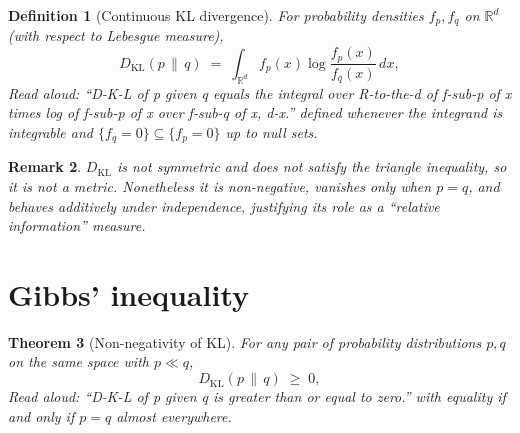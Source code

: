 \documentclass[11pt]{article}
\newtheorem{theorem}{Theorem}
\newtheorem{definition}[theorem]{Definition}
\newtheorem{remark}[theorem]{Remark}
\begin{document}
\begin{definition}[Continuous KL divergence]
For probability densities $f_p, f_q$ on $\mathbb{R}^d$ (with respect to Lebesgue measure),
\[
D_{\mathrm{KL}}(p \,\|\, q) \;=\; \int_{\mathbb{R}^d} f_p(x) \log \frac{f_p(x)}{f_q(x)} \, dx,
\]
\emph{Read aloud:} ``D-K-L of p given q equals the integral over R-to-the-d of f-sub-p of x times log of f-sub-p of x over f-sub-q of x, d-x.''
defined whenever the integrand is integrable and $\{f_q = 0\} \subseteq \{f_p = 0\}$ up to null sets.
\end{definition}

\begin{remark}
$D_{\mathrm{KL}}$ is \emph{not} symmetric and does \emph{not} satisfy the triangle inequality, so it is not a metric. Nonetheless it is non-negative, vanishes only when $p = q$, and behaves additively under independence, justifying its role as a ``relative information'' measure.
\end{remark}

\section{Gibbs' inequality}

\begin{theorem}[Non-negativity of KL]
\label{thm:gibbs}
For any pair of probability distributions $p, q$ on the same space with $p \ll q$,
\[
D_{\mathrm{KL}}(p \,\|\, q) \;\ge\; 0,
\]
\emph{Read aloud:} ``D-K-L of p given q is greater than or equal to zero.''
with equality if and only if $p = q$ almost everywhere.
\end{theorem}
\end{document}
